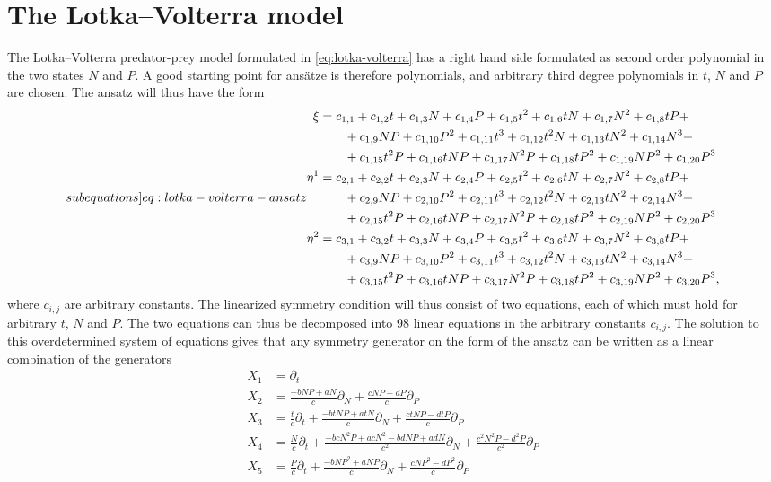 \section{The Lotka--Volterra model}

The Lotka--Volterra predator-prey model formulated in \cref{eq:lotka-volterra} has a right hand side formulated as second order polynomial in the two states \(N\) and \(P\).
A good starting point for ansätze is therefore polynomials, and arbitrary third degree polynomials in \(t\), \(N\) and \(P\) are chosen.
The ansatz will thus have the form
\begin{subequations} \label[subequations]{eq:lotka-volterra-ansatz}
  \begin{align}
    \xi &= c_{1,1} + c_{1,2}t + c_{1,3}N + c_{1,4}P + c_{1,5}t^{2} + c_{1,6}tN + c_{1,7}N^{2} + c_{1,8}tP + \\ & \qquad + c_{1,9}NP + c_{1,10}P^{2} + c_{1,11}t^{3} + c_{1,12}t^{2}N + c_{1,13}tN^{2} + c_{1,14}N^{3} + \\ & \qquad + c_{1,15}t^{2}P + c_{1,16}tNP + c_{1,17}N^{2}P + c_{1,18}tP^{2} + c_{1,19}NP^{2} + c_{1,20}P^{3} \\
    \eta^{1} &= c_{2,1} + c_{2,2}t + c_{2,3}N + c_{2,4}P + c_{2,5}t^{2} + c_{2,6}tN + c_{2,7}N^{2} + c_{2,8}tP + \\ & \qquad + c_{2,9}NP + c_{2,10}P^{2} + c_{2,11}t^{3} + c_{2,12}t^{2}N + c_{2,13}tN^{2} + c_{2,14}N^{3} + \\ & \qquad + c_{2,15}t^{2}P + c_{2,16}tNP + c_{2,17}N^{2}P + c_{2,18}tP^{2} + c_{2,19}NP^{2} + c_{2,20}P^{3} \\
    \eta^{2} &= c_{3,1} + c_{3,2}t + c_{3,3}N + c_{3,4}P + c_{3,5}t^{2} + c_{3,6}tN + c_{3,7}N^{2} + c_{3,8}tP + \\ & \qquad + c_{3,9}NP + c_{3,10}P^{2} + c_{3,11}t^{3} + c_{3,12}t^{2}N + c_{3,13}tN^{2} + c_{3,14}N^{3} + \\ & \qquad + c_{3,15}t^{2}P + c_{3,16}tNP + c_{3,17}N^{2}P + c_{3,18}tP^{2} + c_{3,19}NP^{2} + c_{3,20}P^{3},
  \end{align}
\end{subequations}
where \(c_{i,j}\) are arbitrary constants.
The linearized symmetry condition will thus consist of two equations, each of which must hold for arbitrary \(t\), \(N\) and \(P\).
The two equations can thus be decomposed into 98 linear equations in the arbitrary constants \(c_{i,j}\).
The solution to this overdetermined system of equations gives that any symmetry generator on the form of the ansatz can be written as a linear combination of the generators
\begin{align*}
  X_1 &= \partial_t \\
  X_2 &= \frac{-bNP + aN}{c} \partial_N + \frac{cNP - dP}{c} \partial_P \\
  X_3 &= \frac{t}{c} \partial_t + \frac{-btNP + atN}{c} \partial_N + \frac{ctNP - dtP}{c} \partial_P \\
  X_4 &= \frac{N}{c} \partial_t + \frac{-bcN^2P + acN^2 - bdNP + adN}{c^2} \partial_N + \frac{c^2N^2P - d^2P}{c^2} \partial_P \\
  X_5 &= \frac{P}{c} \partial_t + \frac{-bNP^2 + aNP}{c} \partial_N + \frac{cNP^2 - dP^2}{c} \partial_P
\end{align*}

